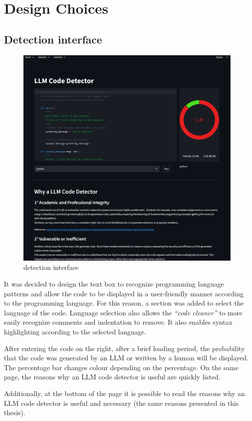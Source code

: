 \clearpage
\section{Design Choices}
\subsection{Detection interface}
\begin{figure}[H]
    \centering
    \includegraphics[width=0.8\linewidth]{img/interfaccia/Screenshot 2025-09-27 172409.png}
    \caption{detection interface}
    \label{fig:gptzeroe}
\end{figure}
It was decided to design the text box to recognize programming 
language patterns and allow the code to be displayed in a 
user-friendly manner according to the programming language. 
For this reason, a section was added to select the 
language of the code. 
Language selection also allows the \textit{“code cleaner”} to more easily recognize 
comments and indentation to remove. It also enables syntax highlighting 
according to the selected language. 

After entering the code on the right, after a brief loading period, 
the probability that the code was generated by an LLM or written by 
a human will be displayed. The percentage bar changes colour 
depending on the percentage. On the same page, the reasons why an LLM code detector 
is useful are quickly listed.

Additionally, at the bottom of the page it is possible to read the 
reasons why an LLM code detector is useful and necessary (the same 
reasons presented in this thesis).

